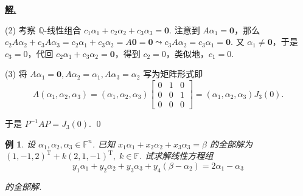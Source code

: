 \documentclass[10pt,openany]{article}
\theoremstyle{thmstyle} %
\theoremstyle{defstyle} %
\theoremstyle{prostyle} %
\theoremstyle{exastyle}
\newtheorem{example}[theorem]{例}
\theoremstyle{remstyle}
\newenvironment{solution}{\par\underline{\textbf{解.}} \;\fangsong}{\qed\par}
\newcommand{\T}{^{\text{T}}}
\newcommand{\F}{\mathbb{F}}
\begin{document}
\begin{solution}
	
	(2) 考察 \( \mathbb{Q}\)-线性组合 \( c_1\alpha_1+c_2\alpha_2+c_3\alpha_3=\bm{0} \). 注意到 \( A\alpha_1=\bm{0} \)，那么 \( c_2A\alpha_2+c_3A\alpha_3=c_2\alpha_1+c_3\alpha_2=A\bm{0}=\bm{0} \leadsto c_3A\alpha_2=c_3\alpha_1=\bm{0} \). 又 \( \alpha_1 \neq \bm{0} \)，于是 \( c_3=0 \)，代回 \( c_2\alpha_1+c_3\alpha_2=\bm{0} \)，得到 \( c_2=0 \)，类似地，\( c_1=0 \).
	
	(3) 将 \( A\alpha_1=\bm{0}, A\alpha_2=\alpha_1, A\alpha_3=\alpha_2 \) 写为矩阵形式即
	\[ A(\alpha_1,\alpha_2,\alpha_3)=(\alpha_1,\alpha_2,\alpha_3)\begin{bmatrix}
		0 & 1 & 0 \\
		0 & 0 & 1 \\
		0 & 0 & 0
	\end{bmatrix}=(\alpha_1,\alpha_2,\alpha_3)J_3(0). \]
	
	于是 \( P^{-1}AP=J_3(0) \).
\end{solution}


\begin{example}
	设 \( \alpha_1,\alpha_2,\alpha_3 \in \F^n \). 已知 \( x_1\alpha_1+x_2\alpha_2+x_3\alpha_3=\beta \) 的全部解为 \( (1,-1,2)\T+ k(2,1,-1)\T, \; k \in \F \). 试求解线性方程组 
	\[ y_1\alpha_1+y_2\alpha_2+y_3\alpha_3+y_4(\beta-\alpha_2)=2\alpha_1-\alpha_3 \]
	
	的全部解.
\end{example}
\end{document}
